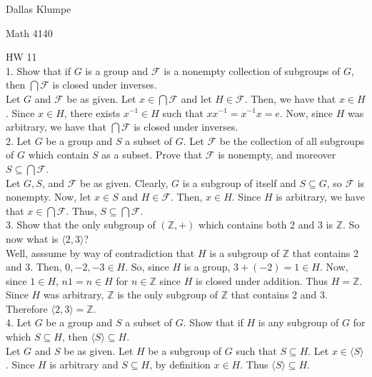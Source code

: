 \documentclass[12pt]{article}
\begin{document}
\noindent Dallas Klumpe

\noindent Math 4140

\noindent HW 11\\

1. Show that if $G$ is a group and $\mathcal{F}$ is a nonempty collection of subgroups of $G$, then $\bigcap\mathcal{F}$ is closed under inverses.\\
Let $G$ and $\mathcal{F}$ be as given. Let $x\in\bigcap\mathcal{F}$ and let $H\in\mathcal{F}$. Then, we have that $x\in H$. Since $x\in H$, there exists $x^{-1}\in H$ such that $xx^{-1}=x^{-1}x=e$. Now, since $H$ was arbitrary, we have that $\bigcap\mathcal{F}$ is closed under inverses.\\[20pt]

2. Let $G$ be a group and $S$ a subset of $G$. Let $\mathcal{F}$ be the collection of all subgroups of $G$ which contain $S$ as a subset. Prove that $\mathcal{F}$ is nonempty, and moreover $S\subseteq\bigcap\mathcal{F}$.\\
Let $G, S$, and $\mathcal{F}$ be as given. Clearly, $G$ is a subgroup of itself and $S\subseteq G$, so $\mathcal{F}$ is nonempty. Now, let $x\in S$ and $H\in\mathcal{F}$. Then, $x\in H$. Since $H$ is arbitrary, we have that $x\in\bigcap\mathcal{F}$. Thus, $S\subseteq\bigcap\mathcal{F}$.\\[20pt]

3. Show that the only subgroup of $(\mathbb{Z},+)$ which contains both 2 and 3 is $\mathbb{Z}$. So now what is $\langle2,3\rangle$?\\
Well, asssume by way of contradiction that $H$ is a subgroup of $\mathbb{Z}$ that contains 2 and 3. Then, $0,-2,-3\in H$. So, since $H$ is a group, $3+(-2)=1\in H$. Now, since $1\in H$, $n1=n\in H$ for $n\in\mathbb{Z}$ since $H$ is closed under addition. Thus $H=\mathbb{Z}$. Since $H$ was arbitrary, $\mathbb{Z}$ is the only subgroup of $\mathbb{Z}$ that contains 2 and 3. Therefore $\langle2,3\rangle=\mathbb{Z}$.\\[20pt]

4. Let $G$ be a group and $S$ a subset of $G$. Show that if $H$ is any subgroup of $G$ for which $S\subseteq H$, then $\langle S\rangle\subseteq H$.\\
Let $G$ and $S$ be as given. Let $H$ be a subgroup of $G$ such that $S\subseteq H$. Let $x\in\langle S\rangle$. Since $H$ is arbitrary and $S\subseteq H$, by definition $x\in H$. Thus $\langle S\rangle\subseteq H$.\\[20pt]
\end{document}
